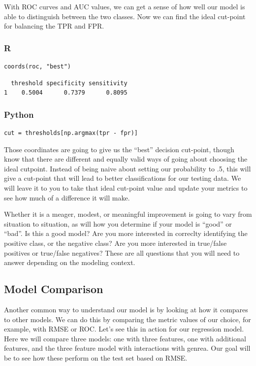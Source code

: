 \documentclass[
  letterpaper,
]{krantz}
\begin{document}
With ROC curves and AUC values, we can get a sense of how well our model
is able to distinguish between the two classes. Now we can find the
ideal cut-point for balancing the TPR and FPR.

\subsubsection{R}

\begin{verbatim}
coords(roc, "best")
\end{verbatim}

\begin{verbatim}
  threshold specificity sensitivity
1    0.5004      0.7379      0.8095
\end{verbatim}

\subsubsection{Python}

\begin{verbatim}
cut = thresholds[np.argmax(tpr - fpr)]
\end{verbatim}

Those coordinates are going to give us the ``best'' decision cut-point,
though know that there are different and equally valid ways of going
about choosing the ideal cutpoint. Instead of being naive about setting
our probability to .5, this will give a cut-point that will lead to
better classifications for our testing data. We will leave it to you to
take that ideal cut-point value and update your metrics to see how much
of a difference it will make.

Whether it is a meager, modest, or meaningful improvement is going to
vary from situation to situation, as will how you determine if your
model is ``good'' or ``bad''. Is this a good model? Are you more
interested in correclty identifying the positive class, or the negative
class? Are you more interested in true/false positives or true/false
negatives? These are all questions that you will need to answer
depending on the modeling context.

\subsection{Model Comparison}\label{model-comparison}

Another common way to understand our model is by looking at how it
compares to other models. We can do this by comparing the metric values
of our choice, for example, with RMSE or ROC. Let's see this in action
for our regression model. Here we will compare three models: one with
three features, one with additional features, and the three feature
model with interactions with genrea. Our goal will be to see how these
perform on the test set based on RMSE.
\end{document}
